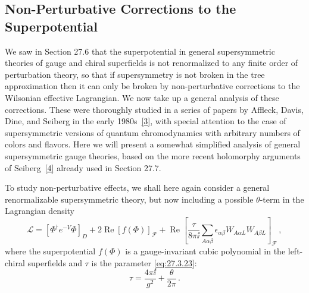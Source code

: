 
\subsection{Non-Perturbative Corrections to the Superpotential}

We saw in Section 27.6 that the superpotential in general supersymmetric
theories of gauge and chiral superfields is not renormalized to any finite
order of perturbation theory, so that if supersymmetry is not broken in the
tree approximation then it can only be broken by non-perturbative
corrections to the Wilsonian effective Lagrangian. We now take up a general
analysis of these corrections. These were thoroughly studied in a series of
papers by Affleck, Davis, Dine, and Seiberg in the early
1980s~\hyperref[ch29-ref-3]{[3]}, with special attention to the case of
supersymmetric versions of quantum chromodynamics with arbitrary numbers
of colors and flavors. Here we will present a somewhat simplified analysis
of general supersymmetric gauge theories, based on the more recent
holomorphy arguments of Seiberg~\hyperref[ch29-ref-4]{[4]} already used in
Section 27.7.

To study non-perturbative effects, we shall here again consider a general
renormalizable supersymmetric theory, but now including a possible
\(\theta\)-term in the Lagrangian density
\begin{equation}
  \mathcal{L}
  =
  \left[\Phi^\dagger e^{-V}\Phi\right]_D
  +2\operatorname{Re}\left[f(\Phi)\right]_{\mathcal{F}}
  +\operatorname{Re}
  \left[
    \frac{\tau}{8\pi \ii}
    \sum_{A\alpha\beta}
    \epsilon_{\alpha\beta}W_{A\alpha L}W_{A\beta L}
  \right]_{\mathcal{F}}\,,
  \tag{29.3.1}\label{eq:29.3.1}
\end{equation}
where the superpotential \(f(\Phi)\) is a gauge-invariant cubic polynomial
in the left-chiral superfields and \(\tau\) is the parameter
\eqref{eq:27.3.23}:
\begin{equation}
  \tau=\frac{4\pi \ii}{g^2}+\frac{\theta}{2\pi}\,.
  \tag{29.3.2}\label{eq:29.3.2}
\end{equation}

